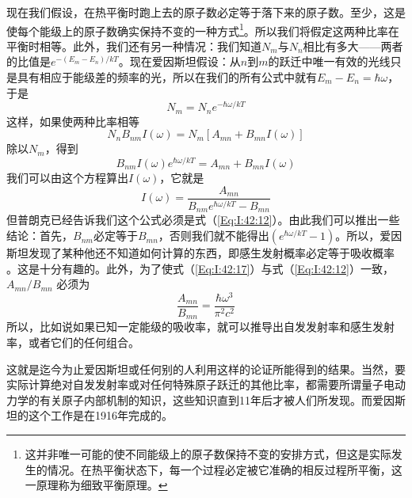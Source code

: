 现在我们假设，在热平衡时跑上去的原子数必定等于落下来的原子数。至少，这是使每个能级上的原子数确实保持不变的一种方式\footnote{这并非唯一可能的使不同能级上的原子数保持不变的安排方式，但这是实际发生的情况。在热平衡状态下，每一个过程必定被它准确的相反过程所平衡，这一原理称为细致平衡原理。}。所以我们将假定这两种比率在平衡时相等。此外，我们还有另一种情况：我们知道$N_m$与$N_n$相比有多大——两者的比值是$e^{-(E_m-E_n)/kT}$。现在爱因斯坦假设：从$n$到$m$的跃迁中唯一有效的光线只是具有相应于能级差的频率的光，所以在我们的所有公式中就有$E_m-E_n=\hbar\omega$，于是
\begin{equation}
    \label{Eq:I:42:15}
    N_m=N_ne^{-\hbar\omega/kT}
\end{equation}
这样，如果使两种比率相等
\begin{equation*}
    N_n B_{nm} I(\omega)=N_m [A_{mn} +B_{mn}I(\omega)]
\end{equation*}
除以$N_m$，得到
\begin{equation}
    \label{Eq:I:42:16}
    B_{nm} I(\omega)e^{\hbar\omega/kT}=A_{mn} +B_{mn}I(\omega)
\end{equation}
我们可以由这个方程算出$I(\omega)$，它就是
\begin{equation}
    \label{Eq:I:42:17}
    I(\omega)=\frac{A_{mn}}{B_{nm}e^{\hbar\omega/kT}-B_{mn}}
\end{equation}
但普朗克已经告诉我们这个公式必须是式（\ref{Eq:I:42:12}）。由此我们可以推出一些结论：首先，$B_{nm}$必定等于$B_{mn}$，否则我们就不能得出$(e^{\hbar\omega/kT}-1)$。所以，爱因斯坦发现了某种他还不知道如何计算的东西，即感生发射概率必定等于吸收概率 。这是十分有趣的。此外，为了使式（\ref{Eq:I:42:17}）与式（\ref{Eq:I:42:12}）一致，$A_{mn} /B_{mn}$ 必须为 
\begin{equation}
    \label{Eq:I:42:18}
    \frac{A_{mn}}{B_{mn}}=\frac{\hbar\omega^3}{\pi^2c^2}
\end{equation}
所以，比如说如果已知一定能级的吸收率，就可以推导出自发发射率和感生发射率，或者它们的任何组合。

这就是迄今为止爱因斯坦或任何别的人利用这样的论证所能得到的结果。当然，要实际计算绝对自发发射率或对任何特殊原子跃迁的其他比率，都需要所谓量子电动力学的有关原子内部机制的知识，这些知识直到11年后才被人们所发现。而爱因斯坦的这个工作是在1916年完成的。

